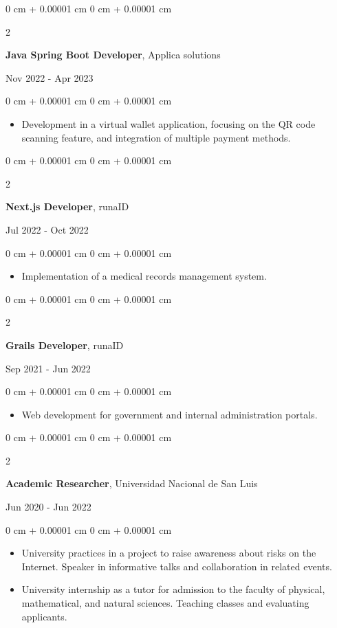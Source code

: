 \documentclass[10pt, letterpaper]{article}
\newenvironment{highlights}{
    \begin{itemize}[
        topsep=0.10 cm,
        parsep=0.10 cm,
        partopsep=0pt,
        itemsep=0pt,
        leftmargin=0 cm + 10pt
    ]
}{
    \end{itemize}
} %
\newenvironment{onecolentry}{
    \begin{adjustwidth}{
        0 cm + 0.00001 cm
    }{
        0 cm + 0.00001 cm
    }
}{
    \end{adjustwidth}
} %
\newenvironment{twocolentry}[2][]{
    \onecolentry
    \def\secondColumn{#2}
    \setcolumnwidth{\fill, 4.5 cm}
    \begin{paracol}{2}
}{
    \switchcolumn \raggedleft \secondColumn
    \end{paracol}
    \endonecolentry
} %
\begin{document}
    \begin{twocolentry}{
            Nov 2022  - Apr 2023
        }
    \textbf{Java Spring Boot Developer}, Applica solutions
    \end{twocolentry}   
    \vspace{0.10 cm}
    \begin{onecolentry}
        \begin{highlights}
            \item Development in a virtual wallet application, focusing on the QR code scanning feature, and integration of multiple payment methods.
        \end{highlights}
    \end{onecolentry}
    \vspace{0.2 cm}
    \begin{twocolentry}{
            Jul 2022  - Oct 2022
        }
        \textbf{Next.js Developer}, runaID
    \end{twocolentry}
    \vspace{0.10 cm}
    \begin{onecolentry}
        \begin{highlights}
            \item Implementation of a medical records management system.
        \end{highlights}
    \end{onecolentry}
    \vspace{0.2 cm}
    \begin{twocolentry}{
            Sep 2021  - Jun 2022
        }
        \textbf{Grails Developer}, runaID
    \end{twocolentry}
    \vspace{0.10 cm}
    \begin{onecolentry}
        \begin{highlights}
            \item Web development for government and internal administration portals.
        \end{highlights}
    \end{onecolentry}
    \vspace{0.2 cm}
    \begin{twocolentry}{
            Jun 2020 - Jun 2022
        }
        \textbf{Academic Researcher}, Universidad Nacional de San Luis
    \end{twocolentry}
    \vspace{0.10 cm}
    \begin{onecolentry}
        \begin{highlights}
            \item University practices in a project to raise awareness about risks on the Internet. Speaker in informative talks and collaboration in related events.
            \item University internship as a tutor for admission to the faculty of physical, mathematical, and natural sciences. Teaching classes and evaluating applicants.
        \end{highlights}
    \end{onecolentry}
    \vspace{0.2 cm}
\end{document}

